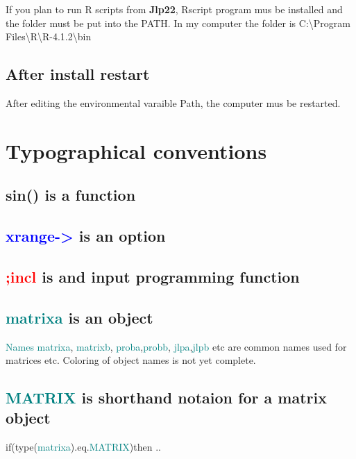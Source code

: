 If you plan to run R scripts from \textbf{Jlp22}, Rscript program mus be installed 
and the folder must be put into the PATH. In my computer the folder is 
C:\textbackslash Program Files\textbackslash R\textbackslash R-4.1.2\textbackslash bin 
\subsection{After install restart} 
\label{afterinstall} 
After editing the environmental varaible Path, the computer mus be restarted. 
\section{Typographical conventions} 
\label{typo} 
\subsection{\textcolor{VioletRed}{sin}() is a function} 
\label{wrfunc} 
\subsection{\textcolor{blue}{xrange->} is an option} 
\label{wropt} 
\subsection{\textcolor{Red}{;incl} is and input programming function} 
\label{wrinpu} 
\subsection{\textcolor{teal}{matrixa} is an object} 
\label{wrobj} 
\textcolor{teal}{Names} \textcolor{teal}{matrixa}, \textcolor{teal}{matrixb}, \textcolor{teal}{proba},\textcolor{teal}{probb}, \textcolor{teal}{jlpa},\textcolor{teal}{jlpb} etc 
are common names used for matrices etc. Coloring of object names is not yet complete. 
\subsection{\textcolor{teal}{MATRIX} is shorthand notaion for a matrix object} 
\label{wrtype} 
\textcolor{VioletRed}{if}(\textcolor{VioletRed}{type}(\textcolor{teal}{matrixa}).eq.\textcolor{teal}{MATRIX})\textcolor{VioletRed}{then} .. 

